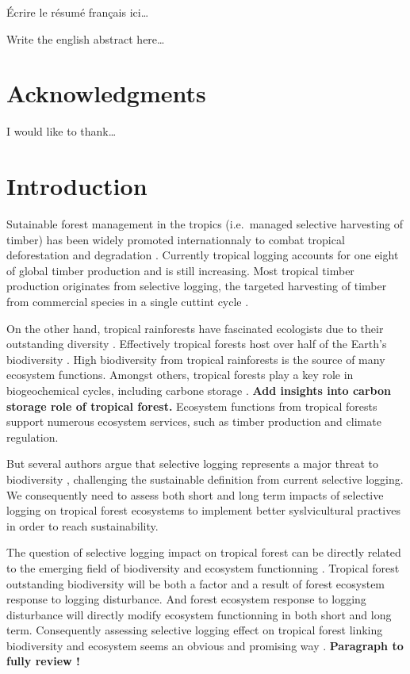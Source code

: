 \documentclass[]{article}
\theoremstyle{definition}
\theoremstyle{definition}
\theoremstyle{remark}
\begin{document}
Écrire le résumé français ici\ldots{}

Write the english abstract here\ldots{}

\section*{Acknowledgments}\label{acknowledgments}

I would like to thank\ldots{}

\section*{Introduction}\label{introduction}

Sutainable forest management in the tropics (i.e.~managed selective
harvesting of timber) has been widely promoted internationnaly to combat
tropical deforestation and degradation \citep{Zimmerman2012}. Currently
tropical logging accounts for one eight of global timber production
\citep{Blaser2011} and is still increasing. Most tropical timber
production originates from selective logging, the targeted harvesting of
timber from commercial species in a single cuttint cycle
\citep{Martin2015}.

On the other hand, tropical rainforests have fascinated ecologists due
to their outstanding diversity \citep{connell_diversity_1978}.
Effectively tropical forests host over half of the Earth's biodiversity
\citep{Scheffers2012}. High biodiversity from tropical rainforests is
the source of many ecosystem functions. Amongst others, tropical forests
play a key role in biogeochemical cycles, including carbone storage
\citep{Lewis2004}. \textbf{Add insights into carbon storage role of
tropical forest.} Ecosystem functions from tropical forests support
numerous ecosystem services, such as timber production and climate
regulation.

But several authors argue that selective logging represents a major
threat to biodiversity
\citep{Carreno-Rocabado2012, DeAvila2015, Gibson2013, Martin2015, Zimmerman2012},
challenging the sustainable definition from current selective logging.
We consequently need to assess both short and long term impacts of
selective logging on tropical forest ecosystems to implement better
syslvicultural practives in order to reach sustainability.

The question of selective logging impact on tropical forest can be
directly related to the emerging field of biodiversity and ecosystem
functionning \citep{Loreau2000}. Tropical forest outstanding
biodiversity will be both a factor and a result of forest ecosystem
response to logging disturbance. And forest ecosystem response to
logging disturbance will directly modify ecosystem functionning in both
short and long term. Consequently assessing selective logging effect on
tropical forest linking biodiversity and ecosystem seems an obvious and
promising way \citep{Loreau2010}. \textbf{Paragraph to fully review !}
\end{document}
